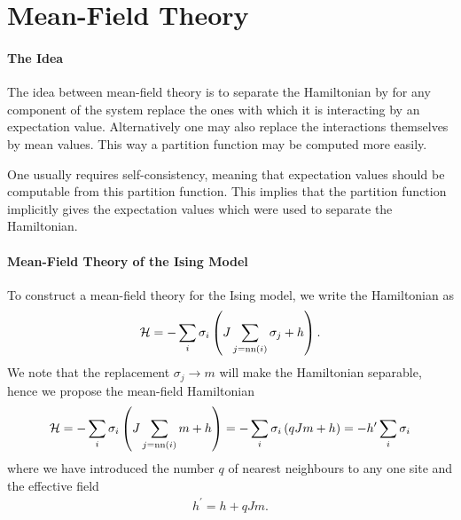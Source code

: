 \section{Mean-Field Theory}

\paragraph{The Idea}
The idea between mean-field theory is to separate the Hamiltonian by for any component of the system replace the ones with which it is interacting by an expectation value. Alternatively one may also replace the interactions themselves by mean values. This way a partition function may be computed more easily.

One usually requires self-consistency, meaning that expectation values should be computable from this partition function. This implies that the partition function implicitly gives the expectation values which were used to separate the Hamiltonian.

\paragraph{Mean-Field Theory of the Ising Model}
To construct a mean-field theory for the Ising model, we write the Hamiltonian as
\begin{align*}
	\mathcal{H} = -\sum\limits_{i}\sigma_{i}\left(J\sum\limits_{j = \text{nn}(i)}\sigma_{j} + h\right).
\end{align*}
We note that the replacement $\sigma_{j}\to m$ will make the Hamiltonian separable, hence we propose the mean-field Hamiltonian
\begin{align*}
	\mathcal{H} = -\sum\limits_{i}\sigma_{i}\left(J\sum\limits_{j = \text{nn}(i)}m + h\right) = -\sum\limits_{i}\sigma_{i}\left(qJm + h\right) = -h^{\prime}\sum\limits_{i}\sigma_{i}
\end{align*}
where we have introduced the number $q$ of nearest neighbours to any one site and the effective field
\begin{align*}
	h^{\prime} = h + qJm.
\end{align*}

